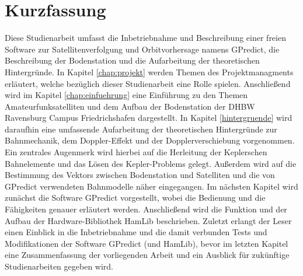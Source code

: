 
\chapter*{Kurzfassung}
Diese Studienarbeit umfasst die Inbetriebnahme und Beschreibung einer freien Software zur Satellitenverfolgung und Orbitvorhersage namens GPredict, die Beschreibung der Bodenstation und die Aufarbeitung der theoretischen Hintergründe.\newpar
In Kapitel \ref{chap:projekt} werden Themen des Projektmanagments erläutert, welche bezüglich dieser Studienarbeit eine Rolle spielen. Anschließend wird im Kapitel \ref{chap:einfuehrung} eine Einführung zu den Themen Amateurfunksatelliten und dem Aufbau der Bodenstation der \ac{DHBW} Ravensburg Campus Friedrichshafen dargestellt.\newpar
In Kapitel \ref{hintergruende} wird daraufhin eine umfassende Aufarbeitung der theoretischen Hintergründe zur Bahnmechanik, dem Doppler-Effekt und der Dopplerverschiebung vorgenommen. Ein zentrales Augenmerk wird hierbei auf die Herleitung der Keplerschen Bahnelemente und das Lösen des Kepler-Problems gelegt. Außerdem wird auf die Bestimmung des Vektors zwischen Bodenstation und Satelliten und die von GPredict verwendeten Bahnmodelle näher eingegangen.\newpar
Im nächsten Kapitel wird zunächst die Software GPredict vorgestellt, wobei die Bedienung und die Fähigkeiten genauer erläutert werden. Anschließend wird die Funktion und der Aufbau der Hardware-Bibliothek HamLib beschrieben. Zuletzt erlangt der Leser einen Einblick in die Inbetriebnahme und die damit verbunden Tests und Modifikationen der Software GPredict (und HamLib), bevor im letzten Kapitel eine Zusammenfassung der vorliegenden Arbeit und ein Ausblick für zukünftige Studienarbeiten gegeben wird.